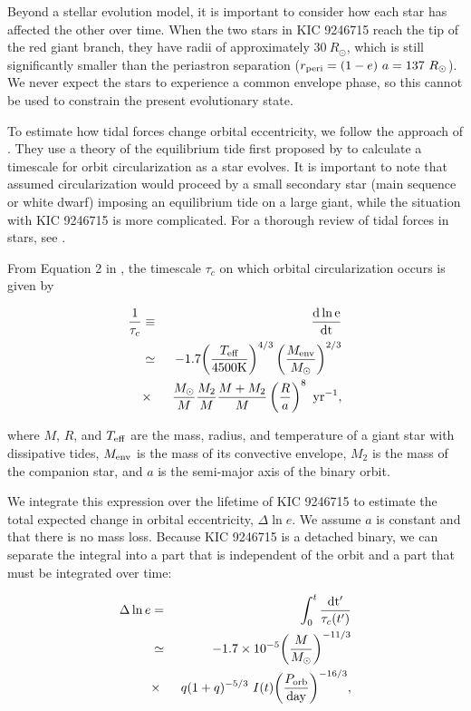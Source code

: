 Beyond a stellar evolution model, it is important to consider how each star has affected the other over time. When the two stars in KIC 9246715 reach the tip of the red giant branch, they have radii of approximately $30 \ R_\odot$, which is still significantly smaller than the periastron separation ($r_{\rm{peri}} = (1-e)~a = 137 \ R_\odot$). We never expect the stars to experience a common envelope phase, so this cannot be used to constrain the present evolutionary state.

To estimate how tidal forces change orbital eccentricity, we follow the approach of \citet{ver95}. They use a theory of the equilibrium tide first proposed by \citet{zah77} to calculate a timescale for orbit circularization as a star evolves. It is important to note that \citet{ver95} assumed circularization would proceed by a small secondary star (main sequence or white dwarf) imposing an equilibrium tide on a large giant, while the situation with KIC 9246715 is more complicated. For a thorough review of tidal forces in stars, see \citet{ogi14}.

From Equation 2 in \citet{ver95}, the timescale $\tau_c$ on which orbital circularization occurs is given by

\begin{eqnarray}
\frac{1}{\tau_c} & \equiv &
\frac{\rm{d} \ln e}{\rm{d}t} \nonumber \\
& \simeq & -1.7 {\left( \frac{T_{\rm{eff}}}{4500 \rm{K}} \right)}^{4/3} \left( \frac{M_{\rm{env}}}{M_{\odot}} \right)^{2/3} \\
& \times & \ \frac{M_{\odot}}{M} \frac{M_2}{M} \frac{M+M_2}{M} \left( \frac{R}{a} \right)^8 \ \rm{yr}^{-1}, \nonumber
\end{eqnarray}

\noindent where $M$, $R$, and $T_{\rm{eff}}$ are the mass, radius, and temperature of a giant star with dissipative tides, $M_{\rm{env}}$ is the mass of its convective envelope, $M_2$ is the mass of the companion star, and $a$ is the semi-major axis of the binary orbit.

We integrate this expression over the lifetime of KIC 9246715 to estimate the total expected change in orbital eccentricity, $\Delta \ln e$. We assume $a$ is constant and that there is no mass loss. Because KIC 9246715 is a detached binary, we can separate the integral into a part that is independent of the orbit and a part that must be integrated over time:

\begin{eqnarray}\label{tide1}
\Delta \ln e  & = &
\int_0^t \frac{\rm{d}t'}{\tau_c(t')} \nonumber \\
& \simeq & -1.7 \times 10^{-5} {\left( \frac{M}{M_{\odot}} \right)}^{-11/3} \\
& \times & \ q(1+q)^{-5/3} \ I(t) {\left( \frac{P_{\rm{orb}}}{\rm{day}} \right)}^{-16/3}, \nonumber
\end{eqnarray}

